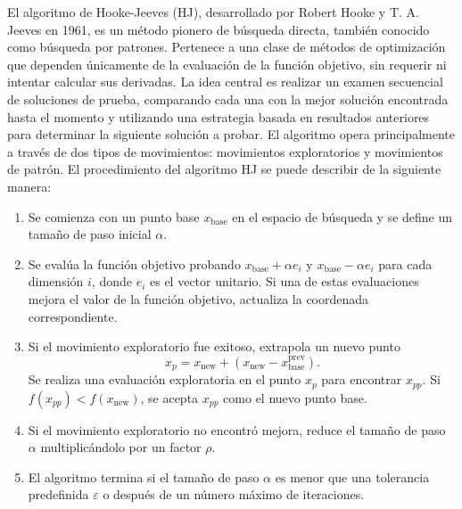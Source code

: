 El algoritmo de Hooke-Jeeves (HJ), desarrollado por Robert Hooke y T. A. Jeeves en 1961, es un método pionero de búsqueda directa, también conocido como búsqueda por patrones. Pertenece a una clase de métodos de optimización que dependen únicamente de la evaluación de la función objetivo, sin requerir ni intentar calcular sus derivadas. La idea central es realizar un examen secuencial de soluciones de prueba, comparando cada una con la mejor solución encontrada hasta el momento y utilizando una estrategia basada en resultados anteriores para determinar la siguiente solución a probar. El algoritmo opera principalmente a través de dos tipos de movimientos: movimientos exploratorios y movimientos de patrón. El procedimiento del algoritmo HJ se puede describir de la siguiente manera:
\begin{enumerate}
    \item {} Se comienza con un punto base $x_{\text{base}}$ en el espacio de búsqueda y se define un tamaño de paso inicial $\alpha$.
    \item {} Se evalúa la función objetivo probando $x_{\text{base}} + \alpha e_i$ y $x_{\text{base}} - \alpha e_i$ para cada dimensión $i$, donde $e_i$ es el vector unitario. Si una de estas evaluaciones mejora el valor de la función objetivo, actualiza la coordenada correspondiente.
    \item {} Si el movimiento exploratorio fue exitoso, extrapola un nuevo punto
    $$x_p = x_{\text{new}} + \left(x_{\text{new}} - x_{\text{base}}^{\text{prev}}\right).$$
    Se realiza una evaluación exploratoria en el punto $x_p$ para encontrar $x_{pp}$. Si $f(x_{pp}) < f(x_{\text{new}})$, se acepta $x_{pp}$ como el nuevo punto base.
    \item {} Si el movimiento exploratorio no encontró mejora, reduce el tamaño de paso $\alpha$ multiplicándolo por un factor $\rho$.
    \item {} El algoritmo termina si el tamaño de paso $\alpha$ es menor que una tolerancia predefinida $\varepsilon$ o después de un número máximo de iteraciones.
\end{enumerate}

